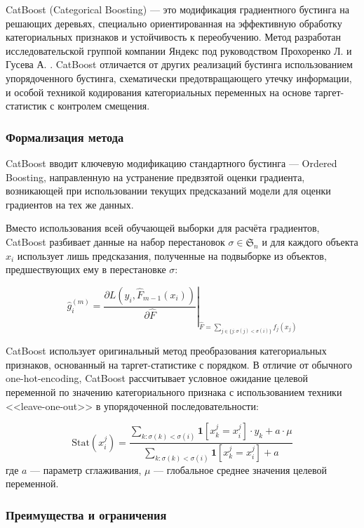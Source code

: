 CatBoost (Categorical Boosting) --- это модификация градиентного бустинга на решающих деревьях, специально ориентированная на эффективную обработку категориальных признаков и устойчивость к переобучению. Метод разработан исследовательской группой компании Яндекс под руководством Прохоренко Л. и Гусева А. \cite{prokhorenkova2018catboost}.  CatBoost отличается от других реализаций бустинга  использованием упорядоченного бустинга, схематически предотвращающего утечку информации, и особой техникой кодирования категориальных переменных на основе таргет-статистик с контролем смещения.

\subsubsection{Формализация метода}

CatBoost вводит ключевую модификацию стандартного бустинга --- Ordered Boosting, направленную на устранение предвзятой оценки градиента, возникающей при использовании текущих предсказаний модели для оценки градиентов на тех же данных.

Вместо использования всей обучающей выборки для расчёта градиентов, CatBoost разбивает данные на набор перестановок $\sigma \in \mathfrak{S}_n$ и для каждого объекта $x_i$ использует лишь предсказания, полученные на подвыборке из объектов, предшествующих ему в перестановке $\sigma$:

\begin{equation}
\hat{g}_i^{(m)} = \left. \frac{\partial L(y_i, \hat{F}_{m-1}(x_i))}{\partial \hat{F}} \right|_{\hat{F} = \sum_{j \in \{j: \sigma(j) < \sigma(i)\}} f_j(x_j)}
\end{equation}

CatBoost использует оригинальный метод преобразования категориальных признаков, основанный на таргет-статистике с порядком. В отличие от обычного one-hot-encoding, CatBoost рассчитывает условное ожидание целевой переменной по значению категориального признака с использованием техники <<leave-one-out>> в упорядоченной последовательности:

\begin{equation}
\text{Stat}(x_i^j) = \frac{\sum_{k: \sigma(k) < \sigma(i)} \mathbf{1}[x_k^j = x_i^j] \cdot y_k + a \cdot \mu}{\sum_{k: \sigma(k) < \sigma(i)} \mathbf{1}[x_k^j = x_i^j] + a}
\end{equation}
где $a$ — параметр сглаживания, $\mu$ — глобальное среднее значения целевой переменной.

\subsubsection{Преимущества и ограничения}

